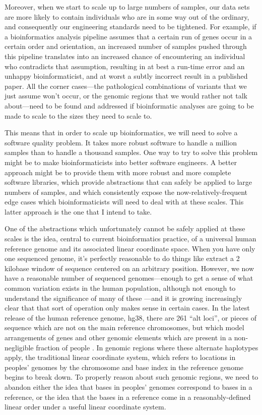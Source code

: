 \documentclass[11pt,proposal]{ucthesis}
\begin{document}
Moreover, when we start to scale up to large numbers of samples, our data sets are more likely to contain individuals who are in some way out of the ordinary, and consequently our engineering standards need to be tightened. For example, if a bioinformatics analysis pipeline assumes that a certain run of genes occur in a certain order and orientation, an increased number of samples pushed through this pipeline translates into an increased chance of encountering an individual who contradicts that assumption, resulting in at best a run-time error and an unhappy bioinformaticist, and at worst a subtly incorrect result in a published paper. All the corner cases---the pathological combinations of variants that we just assume won't occur, or the genomic regions that we would rather not talk about---need to be found and addressed if bioinformatic analyses are going to be made to scale to the sizes they need to scale to.

This means that in order to scale up bioinformatics, we will need to solve a software quality problem. It takes more robust software to handle a million samples than to handle a thousand samples. One way to try to solve this problem might be to make bioinformaticists into better software engineers. A better approach might be to provide them with more robust and more complete software libraries, which provide abstractions that can safely be applied to large numbers of samples, and which consistently expose the now-relatively-frequent edge cases which bioinformaticists will need to deal with at these scales. This latter approach is the one that I intend to take.

One of the abstractions which unfortunately cannot be safely applied at these scales is the idea, central to current bioinformatics practice, of a universal human reference genome and its associated linear coordinate space. When you have only one sequenced genome, it's perfectly reasonable to do things like extract a 2 kilobase window of sequence centered on an arbitrary position. However, we now have a reasonable number of sequenced genomes---enough to get a sense of what common variation exists in the human population, although not enough to understand the significance of many of these \cite{10002010map}---and it is growing increasingly clear that that sort of operation only makes sense in certain cases. In the latest release of the human reference genome, hg38, there are 261 ``alt loci'', or pieces of sequence which are not on the main reference chromosomes, but which model arrangements of genes and other genomic elements which are present in a non-negligible fraction of people \cite{karolchik2014new}. In genomic regions where these alternate haplotypes apply, the traditional linear coordinate system, which refers to locations in peoples' genomes by the chromosome and base index in the reference genome begins to break down. To properly reason about such genomic regions, we need to abandon either the idea that bases in peoples' genomes correspond to bases in a reference, or the idea that the bases in a reference come in a reasonably-defined linear order under a useful linear coordinate system.
\end{document}

